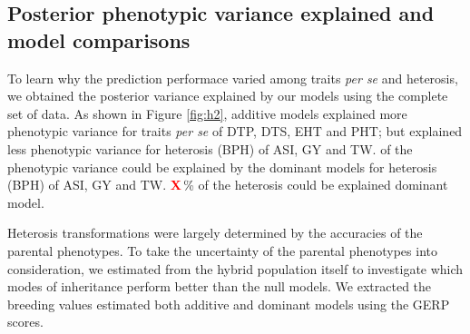 \documentclass[9pt,twocolumn,twoside]{gsajnl}
\newcommand{\X}{\textcolor{red}{\bf X\,}}
\begin{document}
\subsection*{Posterior phenotypic variance explained and model comparisons}

To learn why the prediction performace varied among traits \emph{per se} and heterosis\DIFdelbegin {}\DIFdelend , we obtained the posterior variance explained by our models using the complete set of data. 
As shown in Figure \ref{fig:h2}, additive models explained more phenotypic variance for traits \emph{per se} of DTP, DTS, EHT and PHT; but explained less phenotypic variance for heterosis \DIFdelbegin {}\DIFdelend (BPH) of ASI, GY and TW. 
\DIFdelbegin {}\DIFdelend \DIFaddbegin {}\DIFaddend of the phenotypic variance could be explained by the dominant models for heterosis \DIFdelbegin {}\DIFdelend (BPH) of ASI, GY and TW. 
\DIFdelbegin {}\DIFdelend \DIFaddbegin {}\X \DIFaddend \% of the \DIFaddbegin {}\DIFaddend heterosis could be explained \DIFdelbegin {}\DIFdelend \DIFaddbegin {}\DIFaddend dominant model. 

Heterosis transformations were largely determined by the accuracies of the parental phenotypes. 
To take the uncertainty of the parental phenotypes into consideration, we estimated  \DIFdelbegin {}\DIFdelend \DIFaddbegin {}\DIFaddend from the hybrid population itself to investigate which modes of inheritance perform better than the null models. 
We extracted the breeding values estimated \DIFdelbegin {}\DIFdelend \DIFaddbegin {}\DIFaddend both additive and dominant models using the \DIFdelbegin {}\DIFdelend \DIFaddbegin {}\DIFaddend GERP scores. 
\DIFdelbegin {}\emph{} \DIFdelend \DIFaddbegin {}\DIFaddend 
\end{document}
